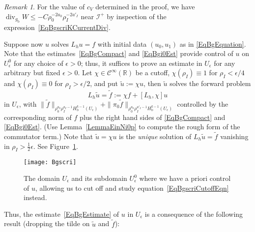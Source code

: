 \documentclass[reqno,11pt,letterpaper]{amsart}
\numberwithin{equation}{section}
\numberwithin{figure}{section}
\theoremstyle{definition}
\theoremstyle{remark}
\newtheorem{rmk}[thm]{Remark}
\newcommand{\mc}{\mathcal}
\newcommand{\cC}{\mc C}
\newcommand{\ms}{\mathscr}
\newcommand{\scri}{\ms I}
\newcommand{\R}{\mathbb{R}}
\newcommand{\dv}{\operatorname{div}}
\newcommand{\eps}{\epsilon}
\newcommand{\wt}{\widetilde}
\newcommand{\bop}{{\mathrm{b}}}
\newcommand{\half}{\tfrac{1}{2}}
\newcommand{\CI}{\cC^\infty}
\newcommand{\Hb}{H_{\bop}}
\begin{document}
\begin{rmk}
\label{RmkBgscriDivSign}
  For the value of $c_V$ determined in the proof, we have $\dv_{g_\bop}W\leq -C\rho_0^{-2 a_0}\rho_I^{-2 a'_I}$ near $\scri^+$ by inspection of the expression~\eqref{EqBgscriKCurrentDiv}.
\end{rmk}

Suppose now $u$ solves $L_h u=f$ with initial data $(u_0,u_1)$ as in \eqref{EqBgEquation}. Note that the estimates~\eqref{EqBgCompact} and \eqref{EqBgi0Est} provide control of $u$ on $U_\eps^0$ for any choice of $\eps>0$; thus, it suffices to prove an estimate in $U_\eps$ for any arbitrary but fixed $\eps>0$. Let $\chi\in\CI(\R)$ be a cutoff, $\chi(\rho_I)\equiv 1$ for $\rho_I<\eps/4$ and $\chi(\rho_I)\equiv 0$ for $\rho_I>\eps/2$, and put $\wt u:=\chi u$, then $\wt u$ solves the forward problem
\begin{equation}
\label{EqBgscriCutoffEqn}
  L_h\wt u = \wt f := \chi f + [L_h,\chi]u
\end{equation}
in $U_\eps$, with $\|\wt f\|_{\rho_0^{a_0}\rho_I^{a_I-1}\Hb^{k-1}(U_\eps)}+\|\pi_0\wt f\|_{\rho_0^{a_0}\rho_I^{a'_I-1}\Hb^{k-1}(U_\eps)}$ controlled by the corresponding norm of $f$ plus the right hand sides of \eqref{EqBgCompact} and \eqref{EqBgi0Est}. (Use Lemma~\ref{LemmaEinNi0p} to compute the rough form of the commutator term.) Note that $\wt u=\chi u$ is the \emph{unique} solution of $L_h\wt u=\wt f$ vanishing in $\rho_I>\half\eps$. See Figure~\ref{FigBgscri}.

\begin{figure}[!ht]
\texttt{[image: Bgscri]}
\caption{The domain $U_\eps$ and its subdomain $U_\eps^0$ where we have a priori control of $u$, allowing us to cut off and study equation~\eqref{EqBgscriCutoffEqn} instead.}
\label{FigBgscri}
\end{figure}

Thus, the estimate~\eqref{EqBgEstimate} of $u$ in $U_\eps$ is a consequence of the following result (dropping the tilde on $\wt u$ and $\wt f$):
\end{document}
